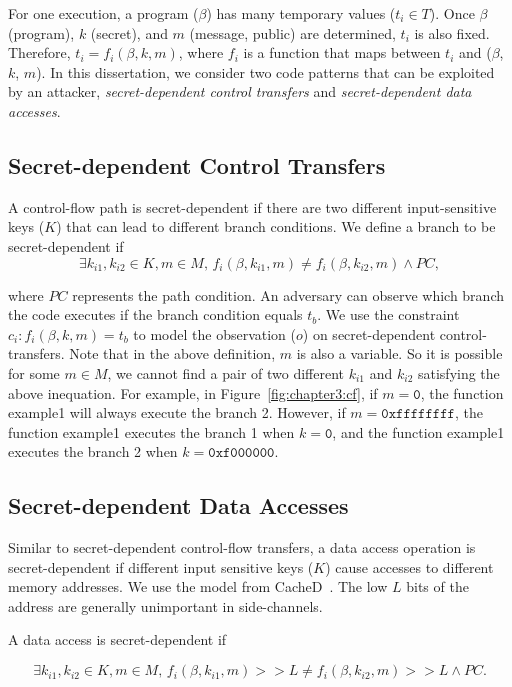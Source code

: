 For one execution, a program ($\beta$) has many temporary values ($t_i \in
  T$). Once $\beta$ (program), $k$ (secret), and $m$ (message, public) are
determined, $t_i$ is also fixed. Therefore, $ t_i = f_i(\beta, k, m)$, where $f_
  i$ is a function that maps between $t_i$ and ($\beta$, $k$, $m$). In this dissertation,
we consider two code patterns that can be exploited by an attacker,
\emph{secret-dependent control transfers} and \emph{secret-dependent data
  accesses}. 

\subsection{Secret-dependent Control Transfers}
A control-flow path is secret-dependent if there are two different input-sensitive keys
($K$) that can lead to different branch conditions.
We define a branch to be secret-dependent if
$$\exists k_{i1}, k_{i2} \in K, m \in M, \,f_i(\beta, k_{i1}, m) \neq f_i(\beta, k_{i2}, m) \land PC,$$

\noindent where $PC$ represents the path condition. An adversary can observe which branch the code executes if the branch condition
equals $t_b$. We use the constraint $c_i : f_i(\beta, k, m) = t_b$ to model
the observation ($o$) on secret-dependent control-transfers. Note that in the
above definition, $m$ is also a variable. So it is possible for some $m \in M$,
we cannot find a pair of two different $k_{i1}$ and $k_{i2}$ satisfying the above inequation. For example, in Figure~\ref{fig:chapter3:cf}, if $m = \mathtt{0}$, the function \textsf{example1} will always execute the branch 2. However, if $m = \mathtt{0xffffffff}$, the function \textsf{example1} executes the branch 1 when $k = \mathtt{0}$, and the function \textsf{example1} executes the branch 2 when $k = \mathtt{0xf000000}$.


\subsection{Secret-dependent Data Accesses}
Similar to secret-dependent control-flow transfers, a data access operation is
secret-dependent if different input sensitive keys ($K$) cause accesses to different memory addresses. We use the model from CacheD~\cite{203878}. The low $L$ bits of the address are generally unimportant in side-channels.

A data access is secret-dependent if

$$\exists k_{i1}, k_{i2} \in K, m \in M,\,f_i(\beta, k_{i1}, m) >> L \neq f_i(\beta, k_{i2}, m) >> L \land PC.$$

